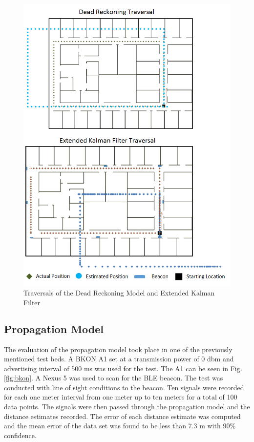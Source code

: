 \documentclass[conference]{IEEEtran}
\begin{document}
\begin{figure}[]
\centering
\includegraphics[scale=0.5]{TraversalMap.png}
\caption{Traversals of the Dead Reckoning Model and Extended Kalman Filter}
\captionsetup{justification=centering,margin=2cm}
\label{fig:traversalmap}
\end{figure}

\subsection{Propagation Model}

The evaluation of the propagation model took place in one of the previously mentioned test beds. A BKON A1 set at a transmission power of 0 dbm and advertising interval of 500 ms was used for the test. The A1 can be seen in Fig. \ref{fig:bkon}. A Nexus 5 was used to scan for the BLE beacon. The test was conducted with line of sight conditions to the beacon. Ten signals were recorded for each one meter interval from one meter up to ten meters for a total of 100 data points. The signals were then passed through the propagation model and the distance estimates recorded. The error of each distance estimate was computed and the mean error of the data set was found to be less than 7.3 m with 90\% confidence.
\end{document}
